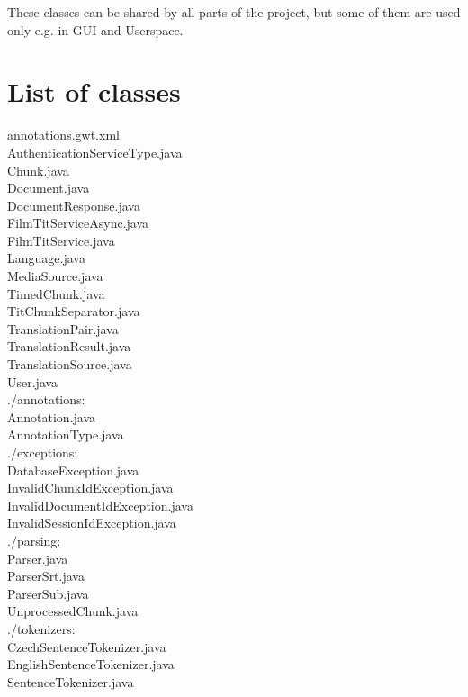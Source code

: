 

These classes can be shared by all parts of the project, but some of them are used only e.g. in GUI and Userspace.
\section{List of classes}
annotations.gwt.xml \\
AuthenticationServiceType.java \\
Chunk.java \\
Document.java \\
DocumentResponse.java \\
FilmTitServiceAsync.java \\
FilmTitService.java \\
Language.java \\
MediaSource.java \\
TimedChunk.java \\
TitChunkSeparator.java \\
TranslationPair.java \\
TranslationResult.java \\
TranslationSource.java \\
User.java \\

./annotations: \\
Annotation.java \\
AnnotationType.java \\

./exceptions: \\
DatabaseException.java \\
InvalidChunkIdException.java \\
InvalidDocumentIdException.java \\
InvalidSessionIdException.java \\

./parsing: \\
Parser.java \\
ParserSrt.java \\
ParserSub.java \\
UnprocessedChunk.java \\

./tokenizers: \\
CzechSentenceTokenizer.java \\
EnglishSentenceTokenizer.java \\
SentenceTokenizer.java \\
